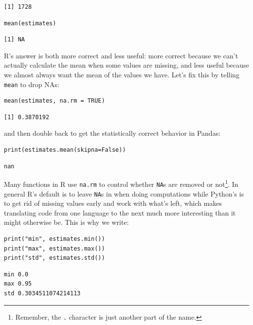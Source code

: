 \begin{lstlisting}
[1] 1728
\end{lstlisting}

\begin{lstlisting}
mean(estimates)
\end{lstlisting}

\begin{lstlisting}
[1] NA
\end{lstlisting}

R's answer is both more correct and less useful:
more correct because we can't actually calculate the mean when some values are missing,
and less useful because we almost always want the mean of the values we have.
Let's fix this by telling \texttt{mean} to drop NAs:

\begin{lstlisting}
mean(estimates, na.rm = TRUE)
\end{lstlisting}

\begin{lstlisting}
[1] 0.3870192
\end{lstlisting}

\noindent
and then double back to get the statistically correct behavior in Pandas:

\begin{lstlisting}
print(estimates.mean(skipna=False))
\end{lstlisting}

\begin{lstlisting}
nan
\end{lstlisting}

Many functions in R use \texttt{na.rm}
to control whether \texttt{NA}s are removed or not\footnote{Remember,
  the \texttt{.} character is just another part of the name.}.
In general
R's default is to leave \texttt{NA}s in when doing  computations
while Python's is to get rid of missing values early and work with what's left,
which makes translating code from one language to the next much more interesting than it might otherwise be.
This is why we write:

\begin{lstlisting}
print("min", estimates.min())
print("max", estimates.max())
print("std", estimates.std())
\end{lstlisting}

\begin{lstlisting}
min 0.0
max 0.95
std 0.3034511074214113
\end{lstlisting}

